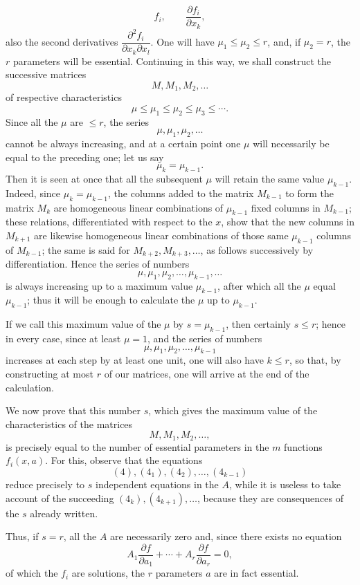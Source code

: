 \documentclass[11pt]{book}
\begin{document}
\[
 f_i,\qquad \frac{\partial f_i}{\partial x_k},
\]
also the second derivatives $\dfrac{\partial^2 f_i}{\partial x_k\partial x_l}$. One will have $\mu_1\le\mu_2\le r$, and, if $\mu_2=r$, the $r$ parameters will be essential. Continuing in this way, we shall construct the successive matrices
\[
 M,
 M_1,
 M_2,
 \ldots
\]
of respective characteristics
\[
 \mu\le\mu_1\le\mu_2\le\mu_3\le\cdots .
\]
Since all the $\mu$ are $\le r$, the series
\[
 \mu,\mu_1,\mu_2,\ldots
\]
cannot be always increasing, and at a certain point one $\mu$ will necessarily be equal to the preceding one; let us say
\[
 \mu_k=\mu_{k-1}.
\]
Then it is seen at once that all the subsequent $\mu$ will retain the same value $\mu_{k-1}$. Indeed, since $\mu_k=\mu_{k-1}$, the columns added to the matrix $M_{k-1}$ to form the matrix $M_k$ are homogeneous linear combinations of $\mu_{k-1}$ fixed columns in $M_{k-1}$; these relations, differentiated with respect to the $x$, show that the new columns in $M_{k+1}$ are likewise homogeneous linear combinations of those same $\mu_{k-1}$ columns of $M_{k-1}$; the same is said for $M_{k+2},M_{k+3},\ldots$, as follows successively by differentiation. Hence the series of numbers
\[
 \mu,\mu_1,\mu_2,\ldots,\mu_{k-1},\ldots
\]
is always increasing up to a maximum value $\mu_{k-1}$, after which all the $\mu$ equal $\mu_{k-1}$; thus it will be enough to calculate the $\mu$ up to $\mu_{k-1}$.

If we call this maximum value of the $\mu$ by $s=\mu_{k-1}$, then certainly $s\le r$; hence in every case, since at least $\mu=1$, and the series of numbers
\[
 \mu,\mu_1,\mu_2,\ldots,\mu_{k-1}
\]
increases at each step by at least one unit, one will also have $k\le r$, so that, by constructing at most $r$ of our matrices, one will arrive at the end of the calculation.

We now prove that this number $s$, which gives the maximum value of the characteristics of the matrices
\[
 M,M_1,M_2,\ldots,
\]
is precisely equal to the number of essential parameters in the $m$ functions $f_i(x,a)$. For this, observe that the equations
\[
 (4),(4_1),(4_2),\ldots,(4_{k-1})
\]
reduce precisely to $s$ independent equations in the $A$, while it is useless to take account of the succeeding $(4_k),(4_{k+1}),\ldots$, because they are consequences of the $s$ already written.

Thus, if $s=r$, all the $A$ are necessarily zero and, since there exists no equation
\[
 A_1\frac{\partial f}{\partial a_1}+\cdots+A_r\frac{\partial f}{\partial a_r}=0,
\]
of which the $f_i$ are solutions, the $r$ parameters $a$ are in fact essential.
\end{document}
